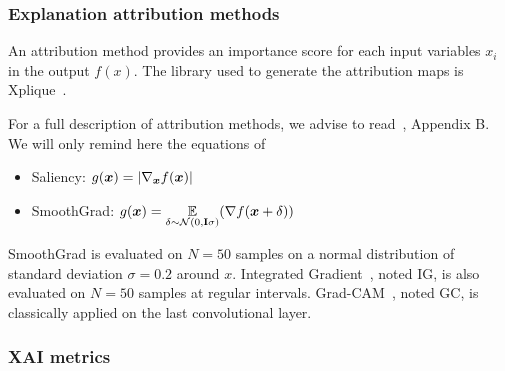 
\subsubsection{Explanation attribution  methods}
An attribution method provides an importance score for each input variables $x_i$ in the output $f(x)$. The library used to generate the attribution maps is Xplique~\cite{fel2021xplique}.

For a full description of attribution methods, we advise to read~\cite{eva}, Appendix B.   We will only remind here the equations of
\begin{itemize}
    \item Saliency:  $g(\bm{x}) = |\nabla_{\bm{x}} f(\bm{x})| $
    \item SmoothGrad:  $ g(\bm{x}) = \underset{\mathbf{\delta} \sim \mathcal{N}(0, \mathbf{I}\sigma)}{\mathbb{E}}( \nabla f(\bm{x} + \mathbf{\delta}))$
\end{itemize}

SmoothGrad is evaluated on $N=50$ samples on a normal distribution of standard deviation $\sigma=0.2$ around $x$. Integrated Gradient~\cite{Sundararajan2017}, noted IG, is also evaluated on $N=50$ samples at regular intervals. Grad-CAM~\cite{Selvaraju_2019}, noted GC, is classically applied on the last convolutional layer. %
\subsubsection{XAI metrics}

